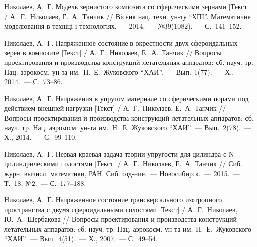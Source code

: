 \begin{biblist}{99}
Николаев, А.~Г. 
Модель зернистого композита со сферическими зернами [Текст] 
/ А.~Г.~Николаев, Е.~А.~Танчик 
// Вісник нац. техн. ун-ту ``ХПІ''. Математичне моделювання в техніці і технологіях.~--- 2014.~--- №39(1082).~--- С.~141--152.

Николаев, А.~Г. 
Напряженное состояние в окрестности двух сфероидальных зерен в композите [Текст] 
/ А.~Г.~Николаев, Е.~А.~Танчик 
// Вопросы проектирования и производства конструкций летательных аппаратов: сб. науч. тр. Нац. аэрокосм. ун-та им.~Н.~Е.~Жуковского ``ХАИ''.~--- Вып.~1(77).~--- Х., 2014.~--- С.~73--86.

Николаев, А.~Г. 
Напряжения в упругом материале со сферическими порами под действием внешней нагрузки [Текст] 
/ А.~Г.~Николаев, Е.~А.~Танчик 
// Вопросы проектирования и производства конструкций летательных аппаратов: сб. науч. тр. Нац. аэрокосм. ун-та им.~Н.~Е.~Жуковского ``ХАИ''.~--- Вып.~2(78).~--- Х., 2014.~--- С.~99--110.

Николаев, А.~Г. 
Первая краевая задача теории упругости для цилиндра с N цилиндрическими полостями [Текст] 
/ А.~Г.~Николаев, Е.~А.~Танчик 
// Сиб. журн. вычисл. математики, РАН. Сиб. отд-ние.~--- Новосибирск.~--- 2015.~--- Т.~18, №2.~--- С.~177--188.

Николаев, А.~Г. 
Напряженное состояние  трансверсального изотропного пространства с двумя сфероидальными полостями [Текст] 
/ А.~Г.~Николаев, Ю.~А.~Щербакова 
// Вопросы проектирования и производства конструкций летательных аппаратов: cб. науч. тр. Нац. аэрокосм. ун-та им.~Н.~Е.~Жуковского ``ХАИ''.~--- Вып.~4(51).~--- Х., 2007.~--- С.~49--54.





\end{biblist}
